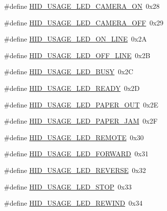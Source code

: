\begin{DoxyCompactItemize}
\item 
\#define \hyperlink{group__USBD__HID_ga1a69b383c0a897a64f1dbb771ccdfa5d}{H\-I\-D\-\_\-\-U\-S\-A\-G\-E\-\_\-\-L\-E\-D\-\_\-\-C\-A\-M\-E\-R\-A\-\_\-\-O\-N}~0x28
\item 
\#define \hyperlink{group__USBD__HID_ga89791b1709215a18b35cda2e0a66c8fa}{H\-I\-D\-\_\-\-U\-S\-A\-G\-E\-\_\-\-L\-E\-D\-\_\-\-C\-A\-M\-E\-R\-A\-\_\-\-O\-F\-F}~0x29
\item 
\#define \hyperlink{group__USBD__HID_ga307a23de9b1083caade208deff40b920}{H\-I\-D\-\_\-\-U\-S\-A\-G\-E\-\_\-\-L\-E\-D\-\_\-\-O\-N\-\_\-\-L\-I\-N\-E}~0x2\-A
\item 
\#define \hyperlink{group__USBD__HID_ga6da65a1c9447187f5430c6772221da77}{H\-I\-D\-\_\-\-U\-S\-A\-G\-E\-\_\-\-L\-E\-D\-\_\-\-O\-F\-F\-\_\-\-L\-I\-N\-E}~0x2\-B
\item 
\#define \hyperlink{group__USBD__HID_ga157655e74dad2e60c7929233a52e3d77}{H\-I\-D\-\_\-\-U\-S\-A\-G\-E\-\_\-\-L\-E\-D\-\_\-\-B\-U\-S\-Y}~0x2\-C
\item 
\#define \hyperlink{group__USBD__HID_ga98027a4d156282b93051f21d18be0003}{H\-I\-D\-\_\-\-U\-S\-A\-G\-E\-\_\-\-L\-E\-D\-\_\-\-R\-E\-A\-D\-Y}~0x2\-D
\item 
\#define \hyperlink{group__USBD__HID_ga593e39843a519d683a85f6b394730385}{H\-I\-D\-\_\-\-U\-S\-A\-G\-E\-\_\-\-L\-E\-D\-\_\-\-P\-A\-P\-E\-R\-\_\-\-O\-U\-T}~0x2\-E
\item 
\#define \hyperlink{group__USBD__HID_ga689e4d119f74e5c53075ad779d6e5136}{H\-I\-D\-\_\-\-U\-S\-A\-G\-E\-\_\-\-L\-E\-D\-\_\-\-P\-A\-P\-E\-R\-\_\-\-J\-A\-M}~0x2\-F
\item 
\#define \hyperlink{group__USBD__HID_ga82eef373cb43c0bdf6dabe0b82f67f04}{H\-I\-D\-\_\-\-U\-S\-A\-G\-E\-\_\-\-L\-E\-D\-\_\-\-R\-E\-M\-O\-T\-E}~0x30
\item 
\#define \hyperlink{group__USBD__HID_ga3a3f725a341f5265875f8690d54d4517}{H\-I\-D\-\_\-\-U\-S\-A\-G\-E\-\_\-\-L\-E\-D\-\_\-\-F\-O\-R\-W\-A\-R\-D}~0x31
\item 
\#define \hyperlink{group__USBD__HID_ga3d2000b30d154ff1a041cd77aef083ed}{H\-I\-D\-\_\-\-U\-S\-A\-G\-E\-\_\-\-L\-E\-D\-\_\-\-R\-E\-V\-E\-R\-S\-E}~0x32
\item 
\#define \hyperlink{group__USBD__HID_ga05bd9837d9c360ba67a3cff43f664698}{H\-I\-D\-\_\-\-U\-S\-A\-G\-E\-\_\-\-L\-E\-D\-\_\-\-S\-T\-O\-P}~0x33
\item 
\#define \hyperlink{group__USBD__HID_ga18ef8eb8f894def11e7bcbea1eddcbe3}{H\-I\-D\-\_\-\-U\-S\-A\-G\-E\-\_\-\-L\-E\-D\-\_\-\-R\-E\-W\-I\-N\-D}~0x34
\item 

\end{DoxyCompactItemize}
